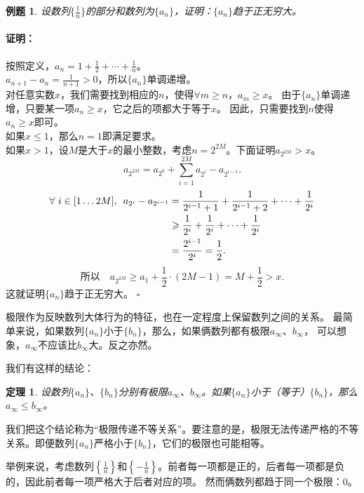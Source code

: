 \documentclass[12pt,UTF8]{ctexbook}
\newtheorem{tm}{定理}[section]
\newtheorem{et}{例题}[section]
\renewenvironment{proof}{\paragraph{\textbf{证明：}}}{\hfill$\square$}
\begin{document}
\begin{et}
    设数列$\{\frac{1}{n}\}$的部分和数列为$\{a_n\}$，证明：$\{a_n\}$趋于正无穷大。
\end{et}
\begin{proof}
    按照定义，$ a_n = 1 + \frac{1}{2} + \cdots + \frac{1}{n}$。\\
    $a_{n+1} - a_n = \frac{1}{n+1} > 0$，所以$\{a_n\}$单调递增。\\
    对任意实数$x$，我们需要找到相应的$n$，使得$\forall m \geqslant n$，$a_m \geqslant x$。
    由于$\{a_n\}$单调递增，只要某一项$a_n \geqslant x$，它之后的项都大于等于$x$。
    因此，只需要找到$n$使得$a_n \geqslant x$即可。\\
    如果$x \leqslant 1$，那么$n=1$即满足要求。\\
    如果$x > 1$，设$M$是大于$x$的最小整数，考虑$n = 2^{2M}$。下面证明$a_{2^{2M}}>x$。\\
    $$ a_{2^{2M}} = a_{2^0} + \sum_{i=1}^{2M}a_{2^i} - a_{2^{i-1}}.$$
    \begin{align}
        \forall \,\, i\in[1\ldots 2M],\,\,\, a_{2^i} - a_{2^{i-1}} &= \frac{1}{2^{i-1}+1} + \frac{1}{2^{i-1}+2} + \cdots + \frac{1}{2^{i}} \notag \\
        &\geqslant \frac{1}{2^{i}} + \frac{1}{2^{i}} + \cdots + \frac{1}{2^{i}} \notag \\
        &= \frac{2^{i-1}}{2^{i}} = \frac{1}{2}. \notag
    \end{align}
    $$ \mbox{所以}\quad  a_{2^{2M}} \geqslant a_1 + \frac{1}{2} \cdot (2M - 1) = M + \frac{1}{2} > x. $$
    这就证明$\{a_n\}$趋于正无穷大。
\end{proof}

极限作为反映数列大体行为的特征，也在一定程度上保留数列之间的关系。
最简单来说，如果数列$\{a_n\}$小于$\{b_n\}$，那么，如果俩数列都有极限$a_\infty$、$b_\infty$，
可以想象，$a_\infty$不应该比$b_\infty$大。反之亦然。

我们有这样的结论：
\begin{tm}
    设数列$\{a_n\}$、$\{b_n\}$分别有极限$a_\infty$、$b_\infty$。如果$\{a_n\}$小于（等于）$\{b_n\}$，那么$a_\infty\leqslant b_\infty$。
\end{tm}

我们把这个结论称为“极限传递不等关系”。要注意的是，极限无法传递严格的不等关系。即便数列$\{a_n\}$严格小于$\{b_n\}$，它们的极限也可能相等。

举例来说，考虑数列$\left\{\frac{1}{n}\right\}$和$\left\{-\frac{1}{n}\right\}$。前者每一项都是正的，后者每一项都是负的，因此前者每一项严格大于后者对应的项。
然而俩数列都趋于同一个极限：$0$。
\end{document}
